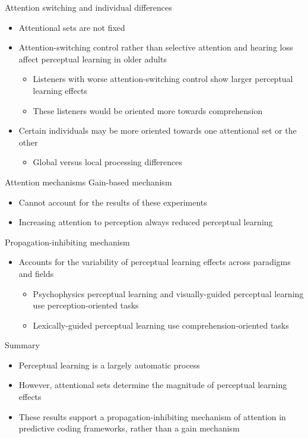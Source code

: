 \documentclass{beamer}
\begin{document}
\begin{frame}{Attention switching and individual differences}
\begin{itemize}
\item Attentional sets are not fixed
\item Attention-switching control rather than selective attention and hearing loss affect perceptual learning in older adults \citep{Scharenborg2014}
\begin{itemize}
\item Listeners with worse attention-switching control show larger perceptual learning effects
\item These listeners would be oriented more towards comprehension
\end{itemize}
\item Certain individuals may be more oriented towards one attentional set or the other
\begin{itemize}
\item Global versus local processing differences
\end{itemize}
\end{itemize}
\end{frame}

\begin{frame}{Attention mechanisms}
Gain-based mechanism
\begin{itemize}
\item Cannot account for the results of these experiments
\item Increasing attention to perception always reduced perceptual learning
\end{itemize}
Propagation-inhibiting mechanism
\begin{itemize}
\item Accounts for the variability of perceptual learning effects across paradigms and fields
\begin{itemize}
\item Psychophysics perceptual learning \citep[for review]{Gilbert2001} and visually-guided perceptual learning \citep[e.g.][]{Bertelson2003} use perception-oriented tasks
\item Lexically-guided perceptual learning use comprehension-oriented tasks \citep[e.g.][]{Norris2003}
\end{itemize}
\end{itemize}
\end{frame}

\begin{frame}{Summary}

  \begin{itemize}
  \item
    Perceptual learning is a largely automatic process
  \item
    However, attentional sets determine the magnitude of perceptual learning effects
  \item
    These results support a propagation-inhibiting mechanism of attention in predictive coding frameworks, rather than a gain mechanism
  \end{itemize}
  
\end{frame}

\begin{frame}[allowframebreaks]%
    {\footnotesize


    }
\end{frame}
\end{document}
